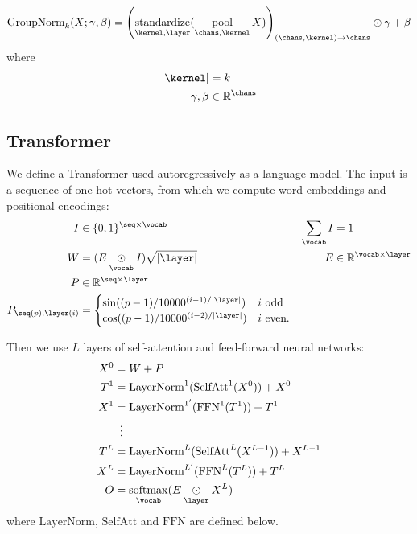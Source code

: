 \documentclass{article}
\newcommand{\reals}{\mathbb{R}}
\begin{document}
\begin{align*}
\text{GroupNorm}_k(X; \gamma, \beta) &= \left( \nfun{\kernel,\layer}{standardize}(\nfun{\chans, \kernel}{pool} X)\right)_{(\chans,\kernel)\rightarrow \chans } \ndot{} \gamma + \beta \\ 
\end{align*}
where
\begin{align*}
|\kernel| &= k\\
\gamma, \beta &\in \mathbb{R}^{\chans} \\
\end{align*}

\subsection{Transformer}
\label{sec:transformer}

We define a Transformer used autoregressively as a language model.
The input is a sequence of one-hot vectors, from which we compute word embeddings and positional encodings:
\begin{align*}
  I &\in \{0, 1\}^{\seq \times \vocab} & \nsum{\vocab} I &= 1 \\
  W &= (E \ndot{\vocab} I)\sqrt{|\layer|} & E &\in \reals^{\vocab \times \layer} \\
  P &\in \reals^{\seq \times \layer} \\
  P_{\seq(p), \layer(i)} &= \begin{cases}
    \sin((p-1) / 10000^{(i-1) / |\layer|}) & \text{$i$ odd} \\ 
    \cos((p-1) / 10000^{(i-2) / |\layer|}) & \text{$i$ even.}
  \end{cases}
\end{align*}

Then we use $L$ layers of self-attention and feed-forward neural networks:
\begin{align*} 
X^0 &= W+P \\
T^1 &= \text{LayerNorm}^1(\text{SelfAtt}^1(X^0)) + X^0\\
X^1 &= \text{LayerNorm}^{1'}(\text{FFN}^1(T^1)) + T^1\\
&\vdotswithin{=} \\
T^{L} &= \text{LayerNorm}^L(\text{SelfAtt}^L(X^{L-1})) + X^{L-1}\\
X^{L} &= \text{LayerNorm}^{L'}(\text{FFN}^L(T^L)) + T^L\\
O &= \nfun{\vocab}{softmax}(E \ndot{\layer} X^L)
\end{align*}
where $\text{LayerNorm}$, $\text{SelfAtt}$ and $\text{FFN}$ are defined below.
\end{document}

